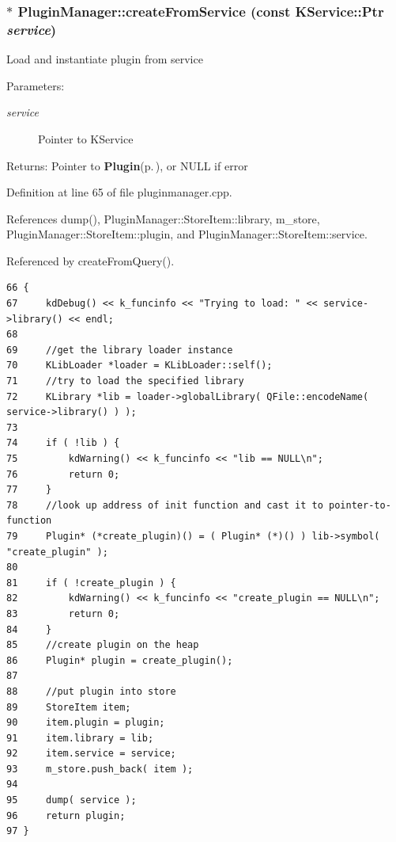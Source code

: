 \subsubsection{ $\ast$ Plugin\-Manager::create\-From\-Service (const KService::Ptr {\em service})\hspace{0.3cm}{\tt  [static]}}\label{classPluginManager_PluginManagere2}


Load and instantiate plugin from service \begin{Desc}
\item[Parameters:]
\begin{description}
\item[{\em service}]Pointer to KService \end{description}
\end{Desc}
\begin{Desc}
\item[Returns:]Pointer to {\bf Plugin}{\rm (p.\,\pageref{classPlugin})}, or NULL if error \end{Desc}


Definition at line 65 of file pluginmanager.cpp.

References dump(), Plugin\-Manager::Store\-Item::library, m\_\-store, Plugin\-Manager::Store\-Item::plugin, and Plugin\-Manager::Store\-Item::service.

Referenced by create\-From\-Query().



\footnotesize\begin{verbatim}66 {
67     kdDebug() << k_funcinfo << "Trying to load: " << service->library() << endl;
68     
69     //get the library loader instance
70     KLibLoader *loader = KLibLoader::self();
71     //try to load the specified library
72     KLibrary *lib = loader->globalLibrary( QFile::encodeName( service->library() ) );
73 
74     if ( !lib ) {
75         kdWarning() << k_funcinfo << "lib == NULL\n";
76         return 0;
77     }
78     //look up address of init function and cast it to pointer-to-function
79     Plugin* (*create_plugin)() = ( Plugin* (*)() ) lib->symbol( "create_plugin" );
80     
81     if ( !create_plugin ) {
82         kdWarning() << k_funcinfo << "create_plugin == NULL\n";
83         return 0;
84     }
85     //create plugin on the heap
86     Plugin* plugin = create_plugin();
87     
88     //put plugin into store
89     StoreItem item;
90     item.plugin = plugin;
91     item.library = lib;
92     item.service = service;
93     m_store.push_back( item );
94     
95     dump( service );
96     return plugin;
97 }
\end{verbatim}\normalsize 


